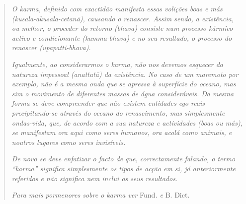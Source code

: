 \begin{quote}
\emph{O karma, definido com exactidão manifesta essas volições boas e más (kusala-akusala-cetanā), causando o renascer. Assim sendo, a existência, ou melhor, o proceder do retorno (bhava) consiste num processo kármico activo e condicionante (kamma-bhava) e no seu resultado, o processo do renascer (upapatti-bhava).}

\emph{Igualmente, ao considerarmos o karma, não nos devemos esquecer da natureza impessoal (anattatā) da existência. No caso de um maremoto por exemplo, não é a mesma onda que se apressa à superfície do oceano, mas sim o movimento de diferentes massas de água consideráveis. Da mesma forma se deve compreender que não existem entidades-ego reais precipitando-se através do oceano do renascimento, mas simplesmente ondas-vida, que, de acordo com a sua natureza e actividades (boas ou más), se manifestam ora aqui como seres humanos, ora acolá como animais, e noutros lugares como seres invisíveis.}

\emph{De novo se deve enfatizar o facto de que, correctamente falando, o termo ``karma'' significa simplesmente os tipos de acção em si, já anteriormente referidos e não significa nem inclui os seus resultados.}

\emph{Para mais pormenores sobre o karma ver} Fund\emph{. e} B. Dict.
\end{quote}
